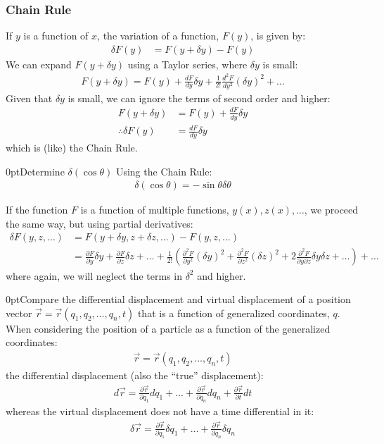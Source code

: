 \subsubsection{Chain Rule}
If $y$ is a function of $x$, the variation of a function, $F(y)$, is given by:
\begin{align}
\delta F(y) &= F(y+\delta y)-F(y)
\end{align}
We can expand $F(y+\delta y)$ using a Taylor series, where $\delta y$ is small:
\begin{align}
F(y+\delta y)=F(y)+\frac{dF}{dy}\delta y + \frac{1}{2!}\frac{d^2F}{dy^2}(\delta y)^2+\dots 
\end{align}
Given that $\delta y$ is small, we can ignore the terms of second order and higher:
\begin{align}
F(y+\delta y)&=F(y)+\frac{dF}{dy}\delta y\nonumber\\
\therefore \delta F(y)&=\frac{dF}{dy}\delta y
\label{eqn:varChainRule}
\end{align}
which is (like) the Chain Rule.
\begin{example}{0pt}{Determine $\delta(\cos{\theta})$}{}
Using the Chain Rule:
\begin{align*}
\delta(\cos{\theta})=-\sin{\theta}\delta\theta
\end{align*}
\end{example}
\noindent
If the function $F$ is a function of multiple functions, $y(x), z(x), \dots$, we proceed the same way, but using partial derivatives:
\begin{align}
\delta F(y,z,\dots) &= F(y+\delta y, z+\delta z, \dots)-F(y,z,\dots)\nonumber\\
&=\frac{\partial F}{\partial y}\delta y +\frac{\partial F}{\partial z}\delta z+\dots+ \frac{1}{2!}\left(\frac{\partial^2F}{\partial y^2}(\delta y)^2+\frac{\partial^2F}{\partial z^2}(\delta z)^2+2\frac{\partial^2 F}{\partial y\partial z}\delta y \delta z+\dots \right) +\dots
\label{eqn:varChainRuleMulti}
\end{align}
where again, we will neglect the terms in $\delta^2$ and higher.
\begin{example}{0pt}{Compare the differential displacement and virtual displacement of a position vector $\vec{r}=\vec{r}(q_1,q_2,\dots,q_n,t)$ that is a function of generalized coordinates, $q$.}{}
When considering the position of a particle as a function of the generalized coordinates:
\begin{align*}
\vec{r}=\vec{r}(q_1,q_2,\dots,q_n,t)
\end{align*}
the differential displacement (also the ``true'' displacement):
\begin{align*}
d\vec{r}=\frac{\partial\vec{r}}{\partial q_1}dq_1+\dots+\frac{\partial\vec{r}}{\partial q_n}dq_n+\frac{\partial\vec{r}}{\partial t}dt
\end{align*}
whereas the virtual displacement does not have a time differential in it:
\begin{align*}
\delta\vec{r}=\frac{\partial\vec{r}}{\partial q_1}\delta q_1+\dots+\frac{\partial\vec{r}}{\partial q_{n}}\delta q_{n}
\end{align*}
\end{example}

